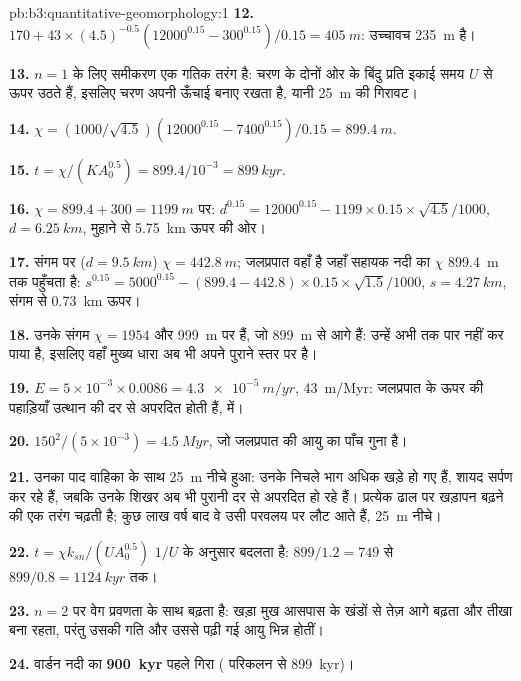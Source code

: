 \begin{solution}{pb:b3:quantitative-geomorphology:1}
\textbf{12.} $170 + 43\times(4.5)^{-0.5}(12000^{0.15} - 300^{0.15})/0.15 =
\qty{405}{m}$: उच्चावच \qty{235}{m} है।

\textbf{13.} $n = 1$ के लिए समीकरण एक गतिक तरंग है: चरण के दोनों ओर के बिंदु
प्रति इकाई समय $U$ से ऊपर उठते हैं, इसलिए चरण अपनी ऊँचाई बनाए रखता है,
यानी \qty{25}{m} की गिरावट।

\textbf{14.} $\chi = (1000/\sqrt{4.5})(12000^{0.15} - 7400^{0.15})/0.15 =
\qty{899.4}{m}$.

\textbf{15.} $t = \chi/(KA_0^{0.5}) = 899.4/10^{-3} = \qty{899}{kyr}$.

\textbf{16.} $\chi = 899.4 + 300 = \qty{1199}{m}$ पर:
$d^{0.15} = 12000^{0.15} - 1199\times0.15\times\sqrt{4.5}/1000$, $d =
\qty{6.25}{km}$, मुहाने से \qty{5.75}{km} ऊपर की ओर।

\textbf{17.} संगम पर ($d = \qty{9.5}{km}$) $\chi = \qty{442.8}{m}$;
जलप्रपात वहाँ है जहाँ सहायक नदी का $\chi$ \qty{899.4}{m} तक पहुँचता है:
$s^{0.15} = 5000^{0.15} - (899.4 - 442.8)\times0.15\times\sqrt{1.5}/1000$,
$s = \qty{4.27}{km}$, संगम से \qty{0.73}{km} ऊपर।

\textbf{18.} उनके संगम $\chi = 1954$ और \qty{999}{m} पर हैं, जो
\qty{899}{m} से आगे हैं:  उन्हें अभी तक पार नहीं कर पाया है, इसलिए वहाँ मुख्य धारा
अब भी अपने पुराने स्तर पर है।

\textbf{19.} $E = 5\times10^{-3}\times0.0086 = \qty{4.3e-5}{m/yr}$,
\qty{43}{m/Myr}: जलप्रपात के ऊपर की पहाड़ियाँ उत्थान की दर से
अपरदित होती हैं,  में।

\textbf{20.} $150^2/(5\times10^{-3}) = \qty{4.5}{Myr}$, जो जलप्रपात की
आयु का पाँच गुना है।

\textbf{21.} उनका पाद वाहिका के साथ \qty{25}{m} नीचे हुआ: उनके
निचले भाग अधिक खड़े हो गए हैं, शायद सर्पण कर रहे हैं, जबकि उनके शिखर अब भी
पुरानी दर से अपरदित हो रहे हैं। प्रत्येक ढाल पर खड़ापन बढ़ने की एक तरंग चढ़ती है; कुछ
लाख वर्ष बाद वे उसी परवलय पर लौट आते हैं, \qty{25}{m} नीचे।

\textbf{22.} $t = \chi k_{sn}/(U A_0^{0.5})$ $1/U$ के अनुसार बदलता है:
$899/1.2 = 749$ से $899/0.8 = \qty{1124}{kyr}$ तक।

\textbf{23.} $n = 2$ पर वेग प्रवणता के साथ बढ़ता है: खड़ा
मुख आसपास के खंडों से तेज़ आगे बढ़ता और तीखा बना रहता, परंतु
उसकी गति और उससे पढ़ी गई आयु भिन्न होतीं।

\textbf{24.} वार्डन नदी का 
\textbf{\qty[text-series-to-math=true]{900}{kyr}} पहले गिरा (
परिकलन से \qty{899}{kyr})।
\end{solution}
